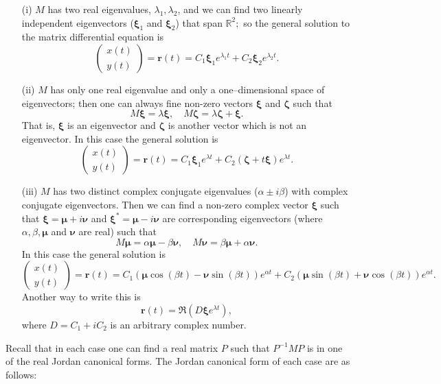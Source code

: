 \documentclass[12pt, a4paper]{article}
\newcommand{\bb}[1]{\mathbb{#1}}
\theoremstyle{definition}
\theoremstyle{plain}
\begin{document}
\begin{itemize}
	
	\item[(i)] $M$ has two real eigenvalues, $\lambda_1,\lambda_2$, and we can find two linearly independent eigenvectors ($\bm{\xi}_1$ and $\bm{\xi}_2$) that span $\bb{R}^2;$ so the general solution to the matrix differential equation is $$\begin{pmatrix} x(t) \\ y(t) \end{pmatrix}=\bm{r}(t)=C_1\bm{\xi}_1e^{\lambda_1 t}+C_2\bm{\xi}_2e^{\lambda_2 t}.$$

	\item[(ii)] $M$ has only one real eigenvalue and only a one--dimensional space of eigenvectors; then one can always fine non-zero vectors $\bm{\xi}$ and $\bm{\zeta}$ such that $$M\bm{\xi}=\lambda \bm{\xi}, \quad M\bm{\zeta}=\lambda \bm{\zeta}+\bm{\xi}.$$ That is, $\bm{\xi}$ is an eigenvector and $\bm{\zeta}$ is another vector which is not an eigenvector. In this case the general solution is $$\begin{pmatrix} x(t) \\ y(t) \end{pmatrix}=\bm{r}(t)=C_1\bm{\xi}_1e^{\lambda t}+C_2(\bm{\zeta}+t\bm{\xi})e^{\lambda t}.$$

	\item[(iii)] $M$ has two distinct complex conjugate eigenvalues ($\alpha\pm i\beta$) with complex conjugate eigenvectors. Then we can find a non-zero complex vector $\bm{\xi}$ such that $\bm{\xi}=\bm{\mu}+i\bm{\nu}$ and $\bm{\xi}^{*}=\bm{\mu}-i\bm{\nu}$ are corresponding eigenvectors (where $\alpha, \beta, \bm{\mu}$ and $\bm{\nu}$ are real) such that $$M\bm{\mu}=\alpha\bm{\mu}-\beta\bm{\nu}, \quad M\bm{\nu}=\beta\bm{\mu}+\alpha\bm{\nu}.$$ In this case the general solution is $$\begin{pmatrix} x(t) \\ y(t) \end{pmatrix}=\bm{r}(t)=C_1\left(\bm{\mu}\cos{(\beta t)}-\bm{\nu}\sin{(\beta t)}\right)e^{\alpha t}+C_2\left(\bm{\mu}\sin{(\beta t)}+\bm{\nu}\cos{(\beta t)}\right)e^{\alpha t}.$$ Another way to write this is $$\bm{r}(t)=\Re\left(D\bm{\xi}e^{\lambda t}\right),$$ where $D = C_1+iC_2$ is an arbitrary complex number.

\end{itemize}

Recall that in each case one can find a real matrix $P$ such that $P^{-1}MP$ is in one of the real Jordan canonical forms. The Jordan canonical form of each case are as follows:
\end{document}
